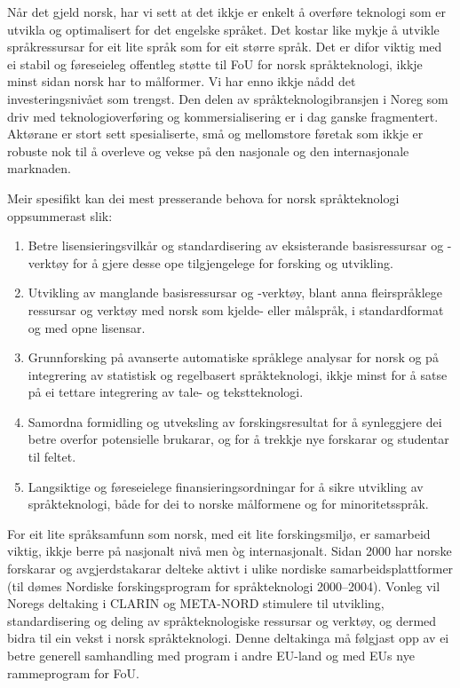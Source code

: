 \begin{multicols}{2}
Når det gjeld norsk, har vi sett at det ikkje er enkelt å overføre teknologi som er utvikla og optimalisert for det engelske språket. 
Det kostar like mykje å utvikle språkressursar for eit lite språk som for eit større språk. Det er difor viktig med ei stabil og føreseieleg offentleg støtte til FoU for norsk språkteknologi, ikkje minst sidan norsk har to målformer. 
Vi har enno ikkje nådd det investeringsnivået som trengst. Den delen av språkteknologibransjen i Noreg som driv med teknologioverføring og kommersialisering er i dag ganske fragmentert. Aktørane er stort sett spesialiserte, små og mellomstore føretak som ikkje er robuste nok til å overleve og vekse på den nasjonale og den internasjonale marknaden.

Meir spesifikt kan dei mest presserande behova for norsk språkteknologi oppsummerast slik:
\begin{enumerate}
\item Betre lisensieringsvilkår og standardisering av eksisterande basisressursar og -verktøy for å gjere desse ope tilgjengelege for forsking og utvikling.
\item Utvikling av manglande basisressursar og -verktøy, blant anna fleirspråklege ressursar og verktøy med norsk som kjelde- eller målspråk, i standardformat og med opne lisensar.
\item Grunnforsking på avanserte automatiske språklege analysar for norsk og på integrering av statistisk og regelbasert språkteknologi, ikkje minst for å satse på ei tettare integrering av tale- og tekstteknologi.
\item Samordna formidling og utveksling av forskingsresultat for å synleggjere dei betre overfor potensielle brukarar, og for å trekkje nye forskarar og studentar til feltet.
\item Langsiktige og føreseielege finansieringsordningar for å sikre utvikling av språkteknologi, både for dei to norske målformene og for minoritetsspråk.
\end{enumerate}

For eit lite språksamfunn som norsk, med eit lite forskingsmiljø, er samarbeid viktig, ikkje berre på nasjonalt nivå men òg internasjonalt. Sidan 2000 har norske forskarar og avgjerdstakarar delteke aktivt i ulike nordiske samarbeidsplattformer  (til dømes Nordiske forskingsprogram for språkteknologi 2000–2004). Vonleg vil Noregs deltaking i CLARIN og META-NORD stimulere til utvikling, standardisering og deling av språkteknologiske ressursar og verktøy, og dermed bidra til ein vekst i norsk språkteknologi.
Denne deltakinga må følgjast opp av ei betre generell samhandling med program i andre EU-land og med EUs nye rammeprogram for FoU.


\end{multicols}
